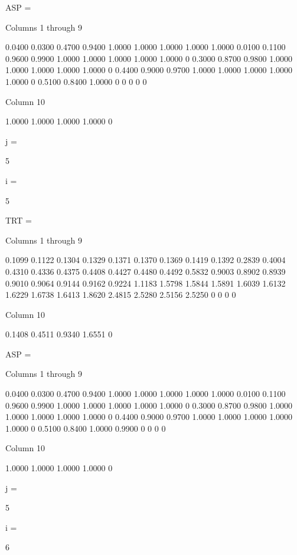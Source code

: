 ASP =

  Columns 1 through 9

    0.0400    0.0300    0.4700    0.9400    1.0000    1.0000    1.0000    1.0000    1.0000
    0.0100    0.1100    0.9600    0.9900    1.0000    1.0000    1.0000    1.0000    1.0000
         0    0.3000    0.8700    0.9800    1.0000    1.0000    1.0000    1.0000    1.0000
         0    0.4400    0.9000    0.9700    1.0000    1.0000    1.0000    1.0000    1.0000
         0    0.5100    0.8400    1.0000         0         0         0         0         0

  Column 10

    1.0000
    1.0000
    1.0000
    1.0000
         0


j =

     5


i =

     5


TRT =

  Columns 1 through 9

    0.1099    0.1122    0.1304    0.1329    0.1371    0.1370    0.1369    0.1419    0.1392
    0.2839    0.4004    0.4310    0.4336    0.4375    0.4408    0.4427    0.4480    0.4492
    0.5832    0.9003    0.8902    0.8939    0.9010    0.9064    0.9144    0.9162    0.9224
    1.1183    1.5798    1.5844    1.5891    1.6039    1.6132    1.6229    1.6738    1.6413
    1.8620    2.4815    2.5280    2.5156    2.5250         0         0         0         0

  Column 10

    0.1408
    0.4511
    0.9340
    1.6551
         0


ASP =

  Columns 1 through 9

    0.0400    0.0300    0.4700    0.9400    1.0000    1.0000    1.0000    1.0000    1.0000
    0.0100    0.1100    0.9600    0.9900    1.0000    1.0000    1.0000    1.0000    1.0000
         0    0.3000    0.8700    0.9800    1.0000    1.0000    1.0000    1.0000    1.0000
         0    0.4400    0.9000    0.9700    1.0000    1.0000    1.0000    1.0000    1.0000
         0    0.5100    0.8400    1.0000    0.9900         0         0         0         0

  Column 10

    1.0000
    1.0000
    1.0000
    1.0000
         0


j =

     5


i =

     6


